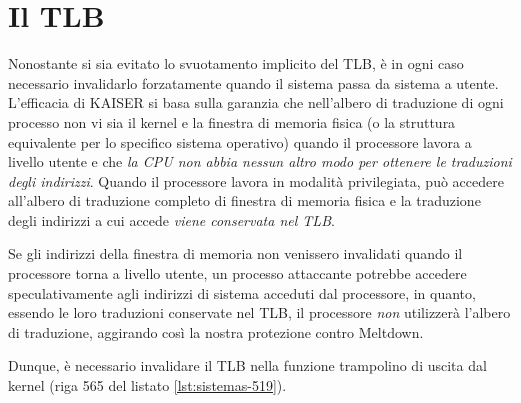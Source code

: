 \section{Il TLB}
Nonostante si sia evitato lo svuotamento implicito del TLB, è in ogni caso necessario invalidarlo forzatamente quando il sistema passa da sistema a utente. 
L'efficacia di KAISER si basa sulla garanzia che nell'albero di traduzione di ogni processo non vi sia il kernel e la finestra di memoria fisica (o la struttura equivalente per lo specifico sistema operativo) quando il processore lavora a livello utente e che \emph{la CPU non abbia nessun altro modo per ottenere le traduzioni degli indirizzi}.
Quando il processore lavora in modalità privilegiata, può accedere all'albero di traduzione completo di finestra di memoria fisica e la traduzione degli indirizzi a cui accede \emph{viene conservata nel TLB}.

Se gli indirizzi della finestra di memoria non venissero invalidati quando il processore torna a livello utente, un processo attaccante potrebbe accedere speculativamente agli indirizzi di sistema acceduti dal processore, in quanto, essendo le loro traduzioni conservate nel TLB, il processore \emph{non} utilizzerà l'albero di traduzione, aggirando così la nostra protezione contro Meltdown.

Dunque, è necessario invalidare il TLB nella funzione trampolino di uscita dal kernel (riga 565 del listato \vref{lst:sistemas-519}).
